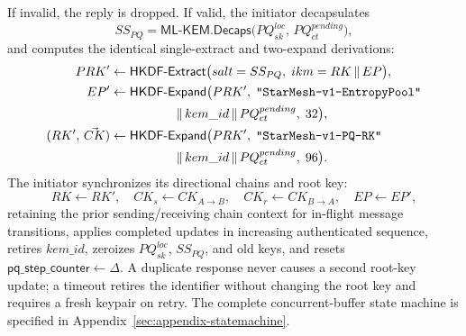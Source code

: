 \documentclass[11pt,a4paper]{article}
\theoremstyle{remark}
\theoremstyle{plain}
\newcommand{\MLKEM}{\mathsf{ML\text{-}KEM}}
\newcommand{\HKDFExtract}{\mathsf{HKDF\text{-}Extract}}
\newcommand{\HKDFExpand}{\mathsf{HKDF\text{-}Expand}}
\newcommand{\Decaps}{\mathsf{Decaps}}
\newcommand{\strlit}[1]{\text{\upshape\texttt{"#1"}}}
\begin{document}
\begin{enumerate}
\[      \]
      If invalid, the reply is dropped.  If valid, the initiator decapsulates
      \[
        SS_{PQ} = \MLKEM.\Decaps\bigl(PQ^{loc}_{sk},\, PQ^{pending}_{ct}\bigr),
      \]
      and computes the identical single-extract and two-expand derivations:
      \begin{align*}
        PRK' &\gets \HKDFExtract\bigl(salt = SS_{PQ},\; ikm = RK \,\|\, EP\bigr), \\
        EP' &\gets \HKDFExpand\bigl(PRK',\; \strlit{StarMesh-v1-EntropyPool} \\
            &\qquad\qquad\quad\;\|\, kem\_id \,\|\, PQ^{pending}_{ct},\; 32\bigr), \\
        (RK',\, \vec{CK}) &\gets \HKDFExpand\bigl(PRK',\; \strlit{StarMesh-v1-PQ-RK} \\
                          &\qquad\qquad\quad\;\|\, kem\_id \,\|\, PQ^{pending}_{ct},\; 96\bigr).
      \end{align*}
      The initiator synchronizes its directional chains and root key:
      \[
        RK \leftarrow RK', \quad CK_s \leftarrow CK_{A\to B}, \quad CK_r \leftarrow CK_{B\to A}, \quad EP \leftarrow EP',
      \]
      retaining the prior sending/receiving chain context for in-flight message transitions,
      applies completed updates in increasing authenticated sequence, retires $kem\_id$,
      zeroizes $PQ^{loc}_{sk}$, $SS_{PQ}$, and old keys, and resets $\mathsf{pq\_step\_counter} \leftarrow \Delta$.
      A duplicate response never causes a second root-key update; a timeout retires the identifier without changing
      the root key and requires a fresh keypair on retry.  The complete concurrent-buffer
      state machine is specified in Appendix~\ref{sec:appendix-statemachine}.
\end{enumerate}
\end{document}
